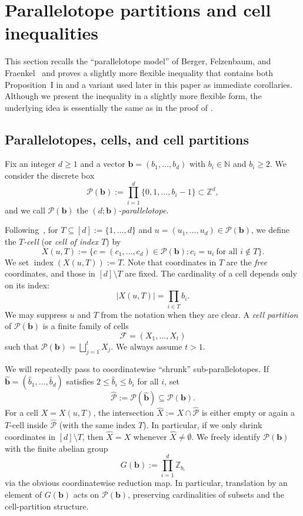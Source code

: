 \documentclass[11pt,reqno]{amsart}
\theoremstyle{definition}
\newcommand{\N}{\mathbb{N}}
\newcommand{\Z}{\mathbb{Z}}
\DeclareMathOperator{\ind}{index}
\begin{document}
\section{Parallelotope partitions and cell inequalities}\label{sec:parallelotope}

This section recalls the ``parallelotope model'' of Berger, Felzenbaum, and Fraenkel~\cite{BFF}
and proves a slightly more flexible inequality that contains both Proposition~I in \cite[\S2]{BFF} and
a variant used later in this paper as immediate corollaries. Although we present the inequality in a slightly more flexible form, the underlying idea is essentially the same as in the proof of \cite{BFF}.

\subsection{Parallelotopes, cells, and cell partitions}

Fix an integer \(d\ge 1\) and a vector \(\mathbf{b}=(b_1,\dots,b_d)\) with \(b_i\in\N\) and \(b_i\ge 2\).
We consider the discrete box
\[
  \mathcal{P}(\mathbf{b})
  :=\prod_{i=1}^d \{0,1,\dots,b_i-1\}\subset \Z^d,
\]
and we call \(\mathcal{P}(\mathbf{b})\) the \emph{\((d;\mathbf{b})\)-parallelotope}.

Following~\cite{BFF}, for \(T\subseteq [d]:=\{1,\dots,d\}\) and \(u=(u_1,\dots,u_d)\in \mathcal{P}(\mathbf{b})\), we define the
\emph{\(T\)-cell} (or \emph{cell of index \(T\)}) by
\[
  X(u,T):=\{c=(c_1,\dots,c_d)\in \mathcal{P}(\mathbf{b}) : c_i=u_i\ \text{for all } i\notin T\}.
\]
We set \(\ind(X(u,T)):=T\). Note that coordinates in \(T\) are the \emph{free} coordinates, and those in \([d]\setminus T\) are fixed.
The cardinality of a cell depends only on its index:
\[
  |X(u,T)|=\prod_{i\in T} b_i.
\]
We may suppress \(u\) and \(T\) from the notation when they are clear.
A \emph{cell partition} of \(\mathcal{P}(\mathbf{b})\) is a finite family of cells
\[
  \mathcal{F}=(X_1,\dots,X_t)
\]
such that \(\mathcal{P}(\mathbf{b})=\bigsqcup_{j=1}^t X_j\). We always assume \(t>1\).

\medskip
We will repeatedly pass to coordinatewise ``shrunk'' sub-parallelotopes.
If \(\hat{\mathbf{b}}=(\hat b_1,\dots,\hat b_d)\) satisfies \(2 \le \hat b_i\le b_i\) for all \(i\), set
\[
  \widehat{\mathcal{P}}:=\mathcal{P}(\hat{\mathbf{b}})\subseteq \mathcal{P}(\mathbf{b}).
\]
For a cell \(X=X(u,T)\), the intersection \(\hat X:=X\cap \widehat{\mathcal{P}}\) is either empty or again a \(T\)-cell inside
\(\widehat{\mathcal{P}}\) (with the same index \(T\)). In particular, if we only shrink coordinates in \([d]\setminus T\),
then \(\hat X=X\) whenever \(\hat X\neq \emptyset\).
We freely identify \(\mathcal{P}(\mathbf{b})\) with the finite abelian group
\[
  G(\mathbf{b}) := \prod_{i=1}^d \Z_{b_i}
\]
via the obvious coordinatewise reduction map. In particular, translation by an element of \(G(\mathbf{b})\)
acts on \(\mathcal{P}(\mathbf{b})\), preserving cardinalities of subsets and the cell-partition structure.
\end{document}
